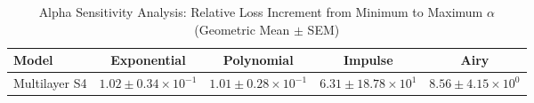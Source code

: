 
\begin{table}[h]
\centering
\caption{Alpha Sensitivity Analysis: Relative Loss Increment from Minimum to Maximum $\alpha$ (Geometric Mean $\pm$ SEM)}
\label{tab:alpha_sensitivity_multilayer_s4}
\begin{tabular}{lcccc}
\hline
Model & Exponential & Polynomial & Impulse & Airy \\
\hline
Multilayer S4 & $1.02 \pm 0.34 \times 10^{-1}$ & $1.01 \pm 0.28 \times 10^{-1}$ & $6.31 \pm 18.78 \times 10^{1}$ & $8.56 \pm 4.15 \times 10^{0}$ \\
\hline
\end{tabular}
\end{table}
